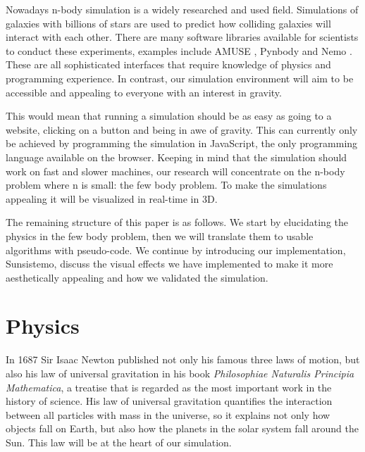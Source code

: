 \documentclass[a4paper]{article}
\begin{document}
Nowadays n-body simulation is a widely researched and used field. Simulations of galaxies with
billions of stars are used to predict how colliding galaxies will interact with each other. There
are many software libraries available for scientists to conduct these experiments, examples include
AMUSE \cite{amuse}, Pynbody \cite{pynbody} and Nemo \cite{nemo}. These are all sophisticated
interfaces that require knowledge of physics and programming experience. In contrast, our simulation
environment will aim to be accessible and appealing to everyone with an interest in gravity.

This would mean that running a simulation should be as easy as going to a website, clicking on a
button and being in awe of gravity. This can currently only be achieved by programming the
simulation in JavaScript, the only programming language available on the browser. Keeping in mind
that the simulation should work on fast and slower machines, our research will concentrate on the
n-body problem where n is small: the few body problem. To make the simulations appealing it will be
visualized in real-time in 3D.

The remaining structure of this paper is as follows. We start by elucidating the physics in the few
body problem, then we will translate them to usable algorithms with pseudo-code. We continue by
introducing our implementation, Sunsistemo, discuss the visual effects we have implemented to make
it more aesthetically appealing and how we validated the simulation.


\section{Physics}
In 1687 Sir Isaac Newton published not only his famous three laws of motion, but also his law of
universal gravitation in his book \textit{Philosophiae Naturalis Principia Mathematica}, a treatise
that is regarded as the most important work in the history of science. \cite{wiki:principia} His law
of universal gravitation quantifies the interaction between all particles with mass in the universe,
so it explains not only how objects fall on Earth, but also how the planets in the solar system fall
around the Sun. This law will be at the heart of our simulation.
\end{document}

